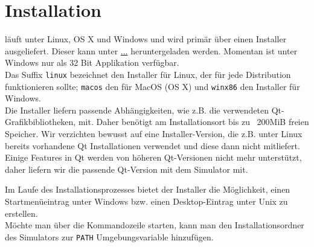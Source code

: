 
\section{Installation}

\erasim{} läuft unter Linux, OS X und Windows und wird primär über einen Installer ausgeliefert. Dieser kann unter \url{...} heruntergeladen werden. Momentan ist \erasim{} unter Windows nur als 32 Bit Applikation verfügbar.\\
Das Suffix \texttt{linux} bezeichnet den Installer für Linux, der für jede Distribution funktionieren sollte; \texttt{macos} den für MacOS (OS X) und \texttt{winx86} den Installer für Windows.\\
Die Installer liefern passende Abhängigkeiten, wie z.B. die verwendeten Qt-Grafikbibliotheken, mit. Daher benötigt \erasim{} am Installationsort bis zu ~200MiB freien Speicher. Wir verzichten bewusst auf eine Installer-Version, die z.B. unter Linux bereits vorhandene Qt Installationen verwendet und diese dann nicht mitliefert. Einige Features in Qt werden von höheren Qt-Versionen nicht mehr unterstützt, daher liefern wir die passende Qt-Version mit dem Simulator mit.

Im Laufe des Installationsprozesses bietet der Installer die Möglichkeit, einen Startmenüeintrag unter Windows bzw. einen Desktop-Eintrag unter Unix zu erstellen.\\
Möchte man \erasim{} über die Kommandozeile starten, kann man den Installationsordner des Simulators zur \texttt{PATH} Umgebungsvariable hinzufügen.